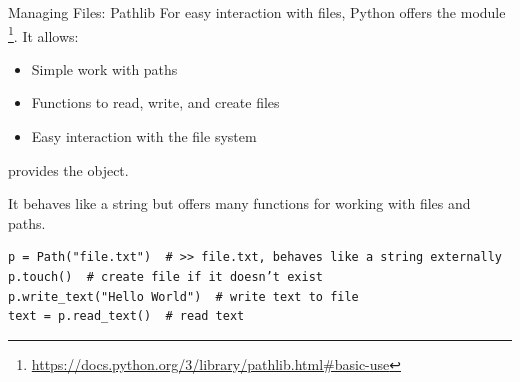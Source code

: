 \documentclass[12pt, aspectratio=169, usepdftitle=false]{beamer}
\newcommand{\furl}[1]{\footnote{\url{#1}}}
\begin{document}
\begin{frame}[fragile]{Managing Files: Pathlib}
  For easy interaction with files, Python offers the module \furl{https://docs.python.org/3/library/pathlib.html\#basic-use}.\newline
  It allows:\pause
  \begin{itemize}
     \item Simple work with paths\pause
	  \item Functions to read, write, and create files\pause
	  \item Easy interaction with the file system\pause
  \end{itemize}

     provides the  object. \pause
    
  \medskip
  
  It behaves like a string but offers many functions for working with files and paths.\pause
	
	\medskip
	
	\begin{lstlisting}[language=pytiny]
p = Path("file.txt")  # >> file.txt, behaves like a string externally
p.touch()  # create file if it doesn’t exist                                   
p.write_text("Hello World")  # write text to file                               
text = p.read_text()  # read text
	\end{lstlisting}
\end{frame}
\end{document}
